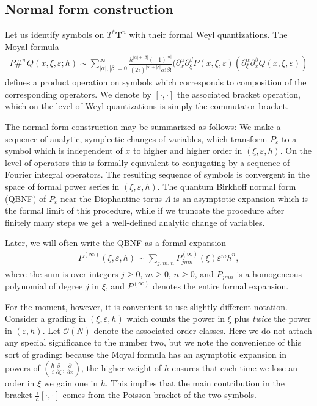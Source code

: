 \documentclass[12pt,lettersize]{article}
\renewcommand{\epsilon}{\varepsilon}
\theoremstyle{plain}%
\numberwithin{theorem}{section}
\numberwithin{equation}{section}
\theoremstyle{definition}
\theoremstyle{remark}
\begin{document}
{\subsection{Normal form construction}\label{BNFconstr}

Let us identify symbols on $T^*\mathbf{T}^n$ with their formal Weyl quantizations. The Moyal formula%
%
\begin{align*}
P\#^w Q(x,\xi,\epsilon;h) \sim \sum_{|\alpha|,|\beta| = 0 }^\infty \frac{h^{|\alpha| + |\beta|}(-1)^{|\alpha|}}{(2i)^{|\alpha|+|\beta|}\alpha!\beta!} (\partial_x^\alpha \partial_\xi^\beta P(x,\xi,\epsilon) ( \partial_\xi^\alpha\partial_x^\beta Q(x,\xi,\epsilon))
\end{align*}
%
defines a product operation on symbols which corresponds to composition of the corresponding operators. We denote by $[\cdot,\cdot]$ the associated bracket operation, which on the level of Weyl quantizations is simply the commutator bracket.

The normal form construction may be summarized as follows: We make a sequence of analytic, symplectic changes of variables, which transform $P_\epsilon$ to a symbol which is independent of $x$ to higher and higher order in $(\xi,\epsilon,h)$. On the level of operators this is formally equivalent to conjugating by a sequence of Fourier integral operators. The resulting sequence of symbols is convergent in the space of formal power series in $(\xi,\epsilon,h)$. The quantum Birkhoff normal form (QBNF) of $P_\epsilon$ near the Diophantine torus $\Lambda$ is {an asymptotic expansion which is} the formal limit of this procedure, while if we truncate the procedure after finitely many steps we get a well-defined analytic change of variables. 

Later, we will often write the QBNF as a formal expansion
%
\begin{align*}{}
  P^{(\infty)}(\xi,\epsilon,h) \sim \sum_{j,m,n} P^{(\infty)}_{jmn}(\xi)\epsilon^m h^n,
\end{align*}
%
where the sum is over integers $j\geq 0$, $m\geq 0$, $n\geq 0$, and $P_{jmn}$ is a homogeneous polynomial of degree $j$ in $\xi$, and $P^{(\infty)}$ denotes the entire formal expansion. %

For the moment, however, it is convenient to use slightly different notation. Consider a grading in $(\xi,\epsilon,h)$ which counts the power in $\xi$ plus {\it twice} the power in $(\epsilon,h)$. Let $\mathcal{O}(N)$ denote the associated order classes. Here we do not attach any special significance to the number two, but we note the convenience of this sort of grading: because the Moyal formula has an asymptotic expansion in powers of $(\frac{h}{i} \frac{\partial}{\partial \xi}, \frac{\partial}{\partial x})$, the higher weight of $h$ ensures that each time we lose an order in $\xi$ we gain one in $h$. This implies that the main contribution in the bracket $\frac{i}{h}[\cdot,\cdot]$ comes from the Poisson bracket of the two symbols. 

}
\end{document}
